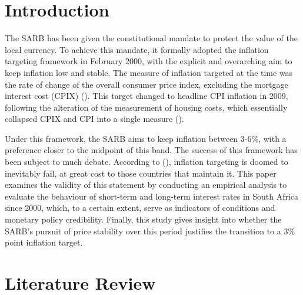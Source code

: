 \documentclass[11pt,preprint]{elsarticle}
\numberwithin{equation}{section}
\numberwithin{figure}{section}
\numberwithin{table}{section}
\begin{document}

\headsep 35pt %




\section{\texorpdfstring{Introduction
\label{Introduction}}{Introduction }}\label{introduction}

The SARB has been given the constitutional mandate to protect the value
of the local currency. To achieve this mandate, it formally adopted the
inflation targeting framework in February 2000, with the explicit and
overarching aim to keep inflation low and stable. The measure of
inflation targeted at the time was the rate of change of the overall
consumer price index, excluding the mortgage interest cost (CPIX)
(). This target changed
to headline CPI inflation in 2009, following the alteration of the
measurement of housing costs, which essentially collapsed CPIX and CPI
into a single measure ().

Under this framework, the SARB aims to keep inflation between 3-6\%,
with a preference closer to the midpoint of this band. The success of
this framework has been subject to much debate. According to
(), inflation targeting is
doomed to inevitably fail, at great cost to those countries that
maintain it. This paper examines the validity of this statement by
conducting an empirical analysis to evaluate the behaviour of short-term
and long-term interest rates in South Africa since 2000, which, to a
certain extent, serve as indicators of conditions and monetary policy
credibility. Finally, this study gives insight into whether the SARB's
pursuit of price stability over this period justifies the transition to
a 3\% point inflation target.

\section{\texorpdfstring{Literature Review
\label{Literature Review}}{Literature Review }}\label{literature-review}
\end{document}
